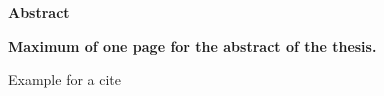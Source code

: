 {\Large \textbf{Abstract}} 

\bigskip

\textbf{Maximum of one page for the abstract of the thesis.}

\lipsum[1-3]

Example for a cite \cite{acharya_agentic_2025}